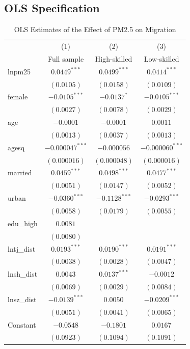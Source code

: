 \documentclass[11pt,twocolumn]{article}
\begin{document}
\subsection{OLS Specification}
\begin{table}[!t]
\centering
\begin{threeparttable}
\caption{OLS Estimates of the Effect of PM2.5 on Migration}
\label{tab:ols}
\small
\begin{tabular}{lccc}
\toprule
 & (1) & (2) & (3) \\
 & Full sample & High-skilled & Low-skilled \\
\midrule
lnpm25 & $0.0449^{***}$ & $0.0499^{***}$ & $0.0414^{***}$ \\
 & $(0.0105)$ & $(0.0158)$ & $(0.0109)$ \\
female & $-0.0105^{***}$ & $-0.0137^{*}$ & $-0.0105^{***}$ \\
 & $(0.0027)$ & $(0.0078)$ & $(0.0029)$ \\
age & $-0.0001$ & $-0.0001$ & $0.0011$ \\
 & $(0.0013)$ & $(0.0037)$ & $(0.0013)$ \\
agesq & $-0.000047^{***}$ & $-0.000056$ & $-0.000060^{***}$ \\
 & $(0.000016)$ & $(0.000048)$ & $(0.000016)$ \\
married & $0.0459^{***}$ & $0.0498^{***}$ & $0.0477^{***}$ \\
 & $(0.0051)$ & $(0.0147)$ & $(0.0052)$ \\
urban & $-0.0360^{***}$ & $-0.1128^{***}$ & $-0.0293^{***}$ \\
 & $(0.0058)$ & $(0.0179)$ & $(0.0055)$ \\
edu\_high & $0.0081$ &  &  \\
 & $(0.0080)$ &  &  \\
lntj\_dist & $0.0193^{***}$ & $0.0190^{***}$ & $0.0191^{***}$ \\
 & $(0.0038)$ & $(0.0028)$ & $(0.0047)$ \\
lnsh\_dist & $0.0043$ & $0.0137^{***}$ & $-0.0012$ \\
 & $(0.0069)$ & $(0.0029)$ & $(0.0084)$ \\
lnsz\_dist & $-0.0139^{***}$ & $0.0050$ & $-0.0209^{***}$ \\
 & $(0.0051)$ & $(0.0041)$ & $(0.0065)$ \\
Constant & $-0.0548$ & $-0.1801$ & $0.0167$ \\
 & $(0.0923)$ & $(0.1094)$ & $(0.1091)$ \\

\end{tabular}
\end{threeparttable}
\end{table}
\end{document}
